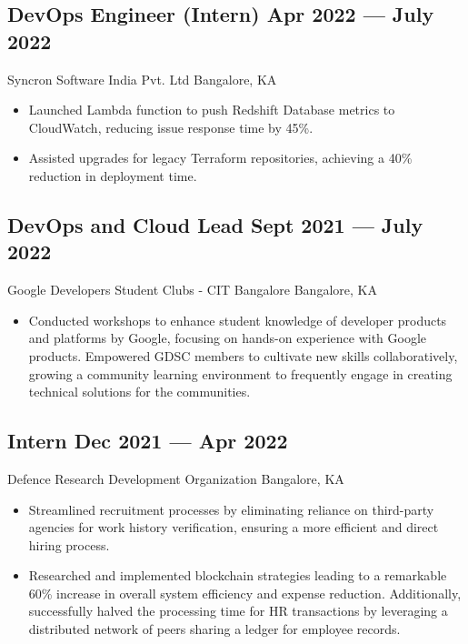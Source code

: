 \documentclass[a4,10pt]{article}
\newcommand{\subtext}[1]{
#1\par\vspace{-0.2cm}}
\newenvironment{zitemize}{
\begin{itemize}\itemsep0pt \parskip0pt \parsep1pt}
{\end{itemize}\vspace{-0.65cm}}
\begin{document}
\subsection*{DevOps Engineer {\normalsize\normalfont (Intern)} \hfill Apr 2022 --- July 2022} 
\subtext{Syncron Software India Pvt. Ltd \hfill Bangalore, KA} 
    \begin{zitemize}
        \item Launched Lambda function to push Redshift Database metrics to CloudWatch, reducing issue response time by 45\%.
        \item Assisted upgrades for legacy Terraform repositories, achieving a 40\% reduction in deployment time.
    \end{zitemize}

\subsection*{DevOps and Cloud Lead \hfill Sept 2021 --- July 2022} 
\subtext{Google Developers Student Clubs - CIT Bangalore \hfill Bangalore, KA} 
    \begin{zitemize}
        \item Conducted workshops to enhance student knowledge of developer products and platforms by Google, focusing on hands-on experience with Google products. Empowered GDSC members to cultivate new skills collaboratively, growing a community learning environment to frequently engage in creating technical solutions for the communities.
    \end{zitemize}
    

\subsection*{Intern \hfill Dec 2021 --- Apr 2022} 
\subtext{Defence Research Development Organization \hfill Bangalore, KA} 
    \begin{zitemize}
        \item Streamlined recruitment processes by eliminating reliance on third-party agencies for work history verification, ensuring a more efficient and direct hiring process.
        \item Researched and implemented blockchain strategies leading to a remarkable 60\% increase in overall system efficiency and expense reduction. Additionally, successfully halved the processing time for HR transactions by leveraging a distributed network of peers sharing a ledger for employee records.
    \end{zitemize}
\end{document}
